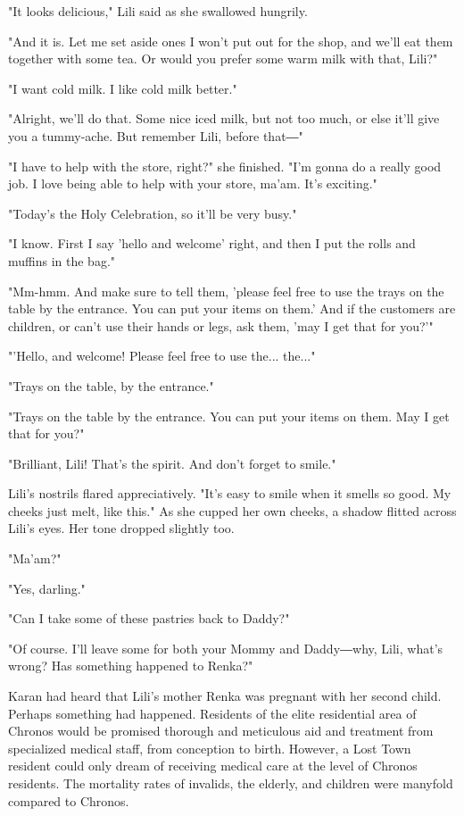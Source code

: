 "It looks delicious," Lili said as she swallowed hungrily.

"And it is. Let me set aside ones I won't put out for the shop, and
we'll eat them together with some tea. Or would you prefer some warm
milk with that, Lili?"

"I want cold milk. I like cold milk better."

"Alright, we'll do that. Some nice iced milk, but not too much, or else
it'll give you a tummy-ache. But remember Lili, before that―"

"I have to help with the store, right?" she finished. "I'm gonna do a
really good job. I love being able to help with your store, ma'am. It's
exciting."

"Today's the Holy Celebration, so it'll be very busy."

"I know. First I say 'hello and welcome' right, and then I put the rolls
and muffins in the bag."

"Mm-hmm. And make sure to tell them, 'please feel free to use the trays
on the table by the entrance. You can put your items on them.' And if
the customers are children, or can't use their hands or legs, ask them,
'may I get that for you?'"

"'Hello, and welcome! Please feel free to use the... the..."

"Trays on the table, by the entrance."

"Trays on the table by the entrance. You can put your items on them. May
I get that for you?"

"Brilliant, Lili! That's the spirit. And don't forget to smile."

Lili's nostrils flared appreciatively. "It's easy to smile when it
smells so good. My cheeks just melt, like this." As she cupped her own
cheeks, a shadow flitted across Lili's eyes. Her tone dropped slightly
too.

"Ma'am?"

"Yes, darling."

"Can I take some of these pastries back to Daddy?"

"Of course. I'll leave some for both your Mommy and Daddy―why, Lili,
what's wrong? Has something happened to Renka?"

Karan had heard that Lili's mother Renka was pregnant with her second
child. Perhaps something had happened. Residents of the elite
residential area of Chronos would be promised thorough and meticulous
aid and treatment from specialized medical staff, from conception to
birth. However, a Lost Town resident could only dream of receiving
medical care at the level of Chronos residents. The mortality rates of
invalids, the elderly, and children were manyfold compared to Chronos.

